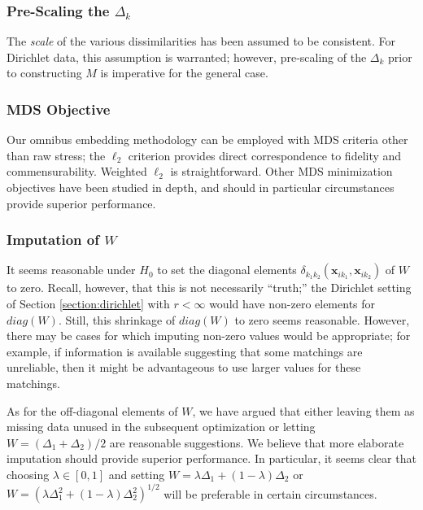 \documentclass[12pt,xcolor]{article}
\newcommand{\1}{\ensuremath{\mbox{{\bf 1}}}}
\begin{document}
\subsubsection*{Pre-Scaling the $\Delta_k$}

The {\em scale} of the various dissimilarities has been assumed to be consistent.
For Dirichlet data, this assumption is warranted;
however, pre-scaling of the $\Delta_k$ prior to constructing $M$ is imperative for the general case.

\subsubsection*{MDS Objective}

Our omnibus embedding methodology can be employed with MDS criteria other than raw stress;
the $\ell_2$ criterion provides direct correspondence to fidelity and commensurability.
Weighted $\ell_2$ is straightforward.
Other MDS minimization objectives have been studied in depth,
and should in particular circumstances provide superior performance.

\subsubsection*{Imputation of $W$}

It seems reasonable under $H_0$ to set the diagonal elements $\delta_{k_1k_2}(\bm{x}_{ik_1},\bm{x}_{ik_2})$ of $W$ to zero.
Recall, however, that this is not necessarily ``truth;''
the Dirichlet setting of Section \ref{section:dirichlet} with $r < \infty$
would have non-zero elements for $diag(W)$.
Still, this shrinkage of $diag(W)$ to zero seems reasonable.
However, there may be cases for which imputing non-zero values would be appropriate;
for example, if information is available suggesting that some matchings are unreliable,
then it might be advantageous to use larger values for these matchings.

As for the off-diagonal elements of $W$, we have argued that either leaving them as missing data
unused in the subsequent optimization or letting $W=(\Delta_1 + \Delta_2)/2$ are reasonable suggestions.
We believe that more elaborate imputation should provide superior performance.
In particular, it seems clear that choosing $\lambda\in[0,1]$
and setting $W=\lambda\Delta_1+(1-\lambda)\Delta_2$ or
$W=(\lambda\Delta_1^2+(1-\lambda)\Delta_2^2)^{1/2}$
will be preferable in certain circumstances.
\end{document}
